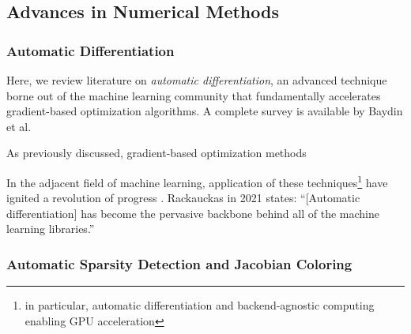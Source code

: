\documentclass[12pt,vi,oneside]{report}
\begin{document}
%
%
%

    \subsection{Advances in Numerical Methods}

    \subsubsection{Automatic Differentiation}

    Here, we review literature on \textit{automatic differentiation}, an advanced technique borne out of the machine learning community that fundamentally accelerates gradient-based optimization algorithms. A complete survey is available by Baydin et al. \cite{baydin_automatic_2018}

    As previously discussed, gradient-based optimization methods


    In the adjacent field of machine learning, application of these techniques\footnote{in particular, automatic differentiation and backend-agnostic computing enabling GPU acceleration} have ignited a revolution of progress \cite{baydin_automatic_2018}. Rackauckas in 2021 \cite{rackauckas_generalizing_2021} states: ``[Automatic differentiation] has become the pervasive backbone behind all of the machine learning libraries.''

    \subsubsection{Automatic Sparsity Detection and Jacobian Coloring}
\end{document}
